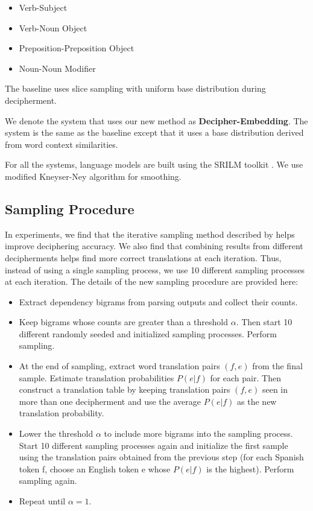 \begin{itemize}
\item Verb-Subject
\item Verb-Noun Object
\item Preposition-Preposition Object
\item Noun-Noun Modifier
\end{itemize}

The baseline uses slice sampling with uniform base distribution during decipherment.

We denote the system that uses our new method as \textbf{Decipher-Embedding}. The system is the same as the baseline except that it uses a base distribution derived from word context similarities.  

For all the systems, language models are built using the SRILM toolkit \cite{srilm}. We use modified Kneyser-Ney \cite{KneserNey95} algorithm for smoothing.


\subsection{Sampling Procedure}
\label{sample_procedure}
In experiments, we find that the iterative sampling method described by  helps improve deciphering accuracy. We also find that combining results from different decipherments helps find more correct translations at each iteration. Thus, instead of using a single sampling process, we use 10 different sampling processes at each iteration. The details of the new sampling procedure are provided here:

 \begin{itemize}
  \item Extract dependency bigrams from parsing outputs and collect their counts.
  \item Keep bigrams whose counts are greater than a threshold $\alpha$. Then start 10 different randomly seeded and initialized sampling processes. Perform sampling.
  \item At the end of sampling, extract word translation pairs $(f,e)$ from the final sample. Estimate translation probabilities $P(e|f)$  for each pair. Then construct a translation table by keeping translation pairs $(f,e)$ seen in more than one decipherment and use the average $P(e|f)$ as the new translation probability.
  \item Lower the threshold $\alpha$ to include more bigrams into the sampling process. Start 10 different sampling processes again and initialize the first sample using the translation pairs obtained from the previous step (for each Spanish token f, choose an English token e whose $P(e|f)$ is the highest). Perform sampling again.
  \item Repeat until $\alpha=1$.
\end{itemize}


